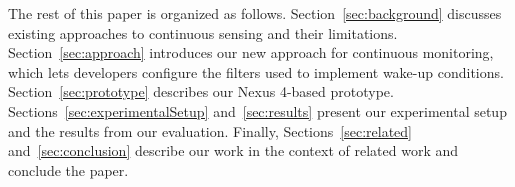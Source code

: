 The rest of this paper is organized as follows.
Section~\ref{sec:background} discusses existing approaches to
continuous sensing and their limitations.  Section~\ref{sec:approach}
introduces our new approach for continuous monitoring, which lets
developers configure the filters used to implement wake-up conditions.
Section~\ref{sec:prototype} describes our Nexus 4-based prototype.
Sections~\ref{sec:experimentalSetup} and~\ref{sec:results} present our
experimental setup and the results from our evaluation.  Finally,
Sections~\ref{sec:related} and~\ref{sec:conclusion} describe our work
in the context of related work and conclude the paper.

